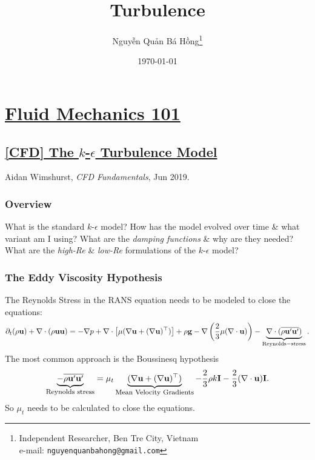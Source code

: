 \documentclass[oneside]{book}
\title{Turbulence}
\author{\selectlanguage{vietnamese} Nguyễn Quản Bá Hồng\footnote{Independent Researcher, Ben Tre City, Vietnam\\e-mail: \texttt{nguyenquanbahong@gmail.com}}}
\date{\today}
\numberwithin{equation}{section}
\begin{document}
\maketitle
\setcounter{secnumdepth}{4}
\setcounter{tocdepth}{4}
\tableofcontents


\chapter{\href{https://www.youtube.com/channel/UCcqQi9LT0ETkRoUu8eYaEkg}{Fluid Mechanics 101}}

\section{\href{https://www.youtube.com/watch?v=fOB91zQ7HJU}{[CFD] The $k$-$\epsilon$ Turbulence Model}}
\begin{flushright}
	 Aidan Wimshurst, \textit{CFD Fundamentals}, Jun 2019.
\end{flushright}

\subsection{Overview}
What is the standard $k$-$\epsilon$ model? How has the model evolved over time \& what variant am I using? What are the \textit{damping functions} \& why are they needed? What are the \textit{high-Re} \& \textit{low-Re} formulations of the $k$-$\epsilon$ model?

\subsection{The Eddy Viscosity Hypothesis}
The Reynolds Stress in the RANS equation needs to be modeled to close the equations:
\begin{align*}
	\partial_t(\rho{\bf u}) + \nabla\cdot(\rho{\bf u}{\bf u}) = -\nabla p + \nabla\cdot\left[\mu(\nabla{\bf u} + (\nabla{\bf u})^\top)\right] + \rho{\bf g} - \nabla\left(\frac{2}{3}\mu(\nabla\cdot{\bf u})\right) - \underbrace{\nabla\cdot(\overline{\rho{\bf u}'{\bf u}'})}_{\rm Reynolds-stress}.
\end{align*}
The most common approach is the Boussinesq hypothesis
\begin{align*}
	\underbrace{-\overline{\rho{\bf u}'{\bf u}'}}_{\mbox{\footnotesize Reynolds stress}} = \mu_t\underbrace{(\nabla{\bf u} + (\nabla{\bf u})^\top)}_{\mbox{\footnotesize Mean Velocity Gradients}} - \frac{2}{3}\rho k{\bf I} - \frac{2}{3}(\nabla\cdot{\bf u}){\bf I}.
\end{align*}
So $\mu_t$ needs to be calculated to close the equations.
\end{document}
